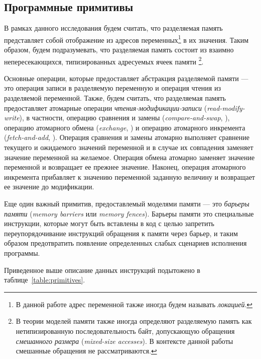\subsection{Программные примитивы}
\label{sec:models-primitives}

В рамках данного исследования будем считать, что
разделяемая память представляет собой отображение
из адресов переменных\footnote{В данной работе адрес переменной 
также иногда будем называть \emph{локацией}.} в их значения. 
Таким образом, будем подразумевать, 
что разделяемая память состоит из взаимно непересекающихся, 
типизированных адресуемых ячеек памяти%
\footnote{В теории моделей памяти также иногда определяют 
разделяемую память как нетипизированную последовательность байт, 
допускающую обращения \emph{смешанного размера} (\emph{mixed-size accesses}). 
В контексте данной работы смешанные обращения не рассматриваются.}.

Основные операции, которые предоставляет абстракция разделяемой памяти --- 
это операция записи в разделяемую переменную и операция чтения из разделяемой переменной. 
Также, будем считать, что разделяемая память предоставляет атомарные операции 
\emph{чтения-модификации-записи} (\emph{read-modify-write}), 
в частности, операцию сравнения и замены (\emph{compare-and-swap}, \CAS), 
операцию атомарного обмена (\emph{exchange}, \EXCHG) 
и операцию атомарного инкремента (\emph{fetch-and-add}, \FADD).
Операция сравнения и замены атомарно выполняет сравнение 
текущего и ожидаемого значений переменной и в случае 
их совпадения заменяет значение переменной на желаемое.
Операция обмена атомарно заменяет значение переменной 
и возвращает ее прежнее значение. 
Наконец, операция атомарного инкремента прибавляет 
к значению переменной заданную величину и
возвращает ее значение до модификации.



Еще один важный примитив, 
предоставлемый моделями памяти --- это \emph{барьеры памяти} 
(\emph{memory barriers} или \emph{memory fences}).
Барьеры памяти это специальные инструкции, которые 
могут быть вставлены в код с целью запретить 
переупорядочивание инструкций обращения к памяти через барьер, 
и таким образом предотвратить появление 
определенных слабых сценариев исполнения программы.

Приведенное выше описание данных инструкций
подытожено в таблице~\ref{table:primitives}. 

